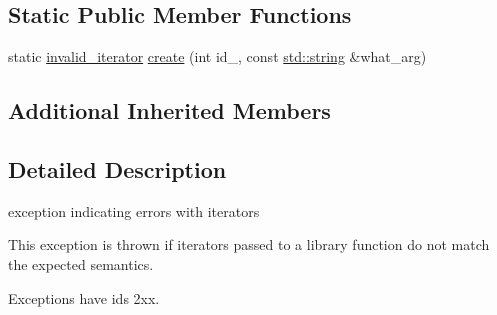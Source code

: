 \subsection*{Static Public Member Functions}
\begin{DoxyCompactItemize}
\item 
static \hyperlink{classnlohmann_1_1detail_1_1invalid__iterator}{invalid\+\_\+iterator} \hyperlink{classnlohmann_1_1detail_1_1invalid__iterator_a4e849260a3caa1b288c7e619130c6c09}{create} (int id\+\_\+, const \hyperlink{namespacenlohmann_1_1detail_a1ed8fc6239da25abcaf681d30ace4985ab45cffe084dd3d20d928bee85e7b0f21}{std\+::string} \&what\+\_\+arg)
\end{DoxyCompactItemize}
\subsection*{Additional Inherited Members}


\subsection{Detailed Description}
exception indicating errors with iterators 

This exception is thrown if iterators passed to a library function do not match the expected semantics.

Exceptions have ids 2xx.

